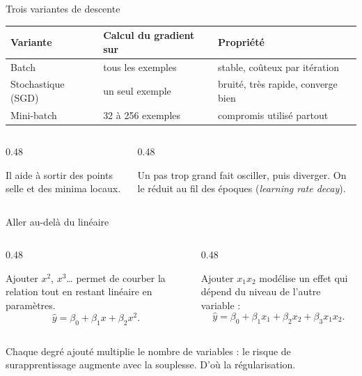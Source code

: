 \begin{frame}{Trois variantes de descente}
\begin{center}
\small
\begin{tabular}{@{}p{}p{}p{}@{}}
\toprule
\textbf{Variante} & \textbf{Calcul du gradient sur} & \textbf{Propriété} \\
\midrule
Batch & tous les exemples & stable, coûteux par itération \\
Stochastique (SGD) & un seul exemple & bruité, très rapide, converge bien \\
Mini-batch & 32 à 256 exemples & compromis utilisé partout \\
\bottomrule
\end{tabular}
\end{center}
\vspace{2mm}
\begin{columns}[t]
\begin{column}{0.48\textwidth}
\begin{kbox}
Il aide à sortir des points selle et des minima locaux.
\end{kbox}
\end{column}
\begin{column}{0.48\textwidth}
\begin{wbox}
Un pas trop grand fait osciller, puis diverger. On le réduit au fil des
époques (\emph{learning rate decay}).
\end{wbox}
\end{column}
\end{columns}
\end{frame}

\begin{frame}{Aller au-delà du linéaire}
\begin{columns}[t]
\begin{column}{0.48\textwidth}
\begin{ebox}
Ajouter $x^2$, $x^3$\ldots{} permet de courber la relation tout en restant
linéaire en paramètres.
\[
  \hat y=\beta_0+\beta_1 x+\beta_2 x^2 .
\]
\end{ebox}
\end{column}
\begin{column}{0.48\textwidth}
\begin{ebox}[Interactions]
Ajouter $x_1 x_2$ modélise un effet qui dépend du niveau de l'autre variable :
\[
  \hat y=\beta_0+\beta_1x_1+\beta_2x_2+\beta_3x_1x_2 .
\]
\end{ebox}
\end{column}
\end{columns}
\vspace{2mm}
\begin{wbox}
Chaque degré ajouté multiplie le nombre de variables : le risque de
surapprentissage augmente avec la souplesse. D'où la régularisation.
\end{wbox}
\end{frame}

